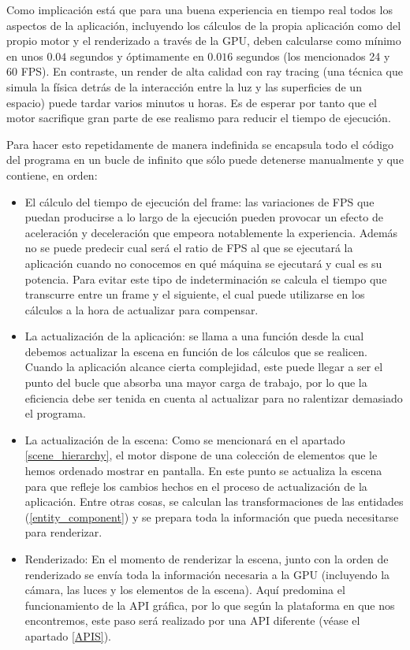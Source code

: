 Como implicación está que para una buena experiencia en tiempo real todos los aspectos de la aplicación, incluyendo los cálculos de la propia aplicación como del propio motor y el renderizado a través de la GPU, deben calcularse como mínimo en unos $0.04$ segundos y óptimamente en $0.016$ segundos (los mencionados 24 y 60 FPS). En contraste, un render de alta calidad con ray tracing (una técnica que simula la física detrás de la interacción entre la luz y las superficies de un espacio) puede tardar varios minutos u horas. Es de esperar por tanto que el motor sacrifique gran parte de ese realismo para reducir el tiempo de ejecución.

Para hacer esto repetidamente de manera indefinida se encapsula todo el código del programa en un bucle de infinito que sólo puede detenerse manualmente y que contiene, en orden:

\begin{itemize}
    \item El cálculo del tiempo de ejecución del frame: las variaciones de FPS que puedan producirse a lo largo de la ejecución pueden provocar un efecto de aceleración y deceleración que empeora notablemente la experiencia. Además no se puede predecir cual será el ratio de FPS al que se ejecutará la aplicación cuando no conocemos en qué máquina se ejecutará y cual es su potencia. Para evitar este tipo de indeterminación se calcula el tiempo que transcurre entre un frame y el siguiente, el cual puede utilizarse en los cálculos a la hora de actualizar para compensar.
    \item La actualización de la aplicación: se llama a una función desde la cual debemos actualizar la escena en función de los cálculos que se realicen. Cuando la aplicación alcance cierta complejidad, este puede llegar a ser el punto del bucle que absorba una mayor carga de trabajo, por lo que la eficiencia debe ser tenida en cuenta al actualizar para no ralentizar demasiado el programa.
    \item La actualización de la escena: Como se mencionará en el apartado \ref{scene_hierarchy}, el motor dispone de una colección de elementos que le hemos ordenado mostrar en pantalla. En este punto se actualiza la escena para que refleje los cambios hechos en el proceso de actualización de la aplicación. Entre otras cosas, se calculan las transformaciones de las entidades (\ref{entity_component}) y se prepara toda la información que pueda necesitarse para renderizar.
    \item Renderizado: En el momento de renderizar la escena, junto con la orden de renderizado se envía toda la información necesaria a la GPU (incluyendo la cámara, las luces y los elementos de la escena). Aquí predomina el funcionamiento de la API gráfica, por lo que según la plataforma en que nos encontremos, este paso será realizado por una API diferente (véase el apartado \ref{APIS}).
\end{itemize}

